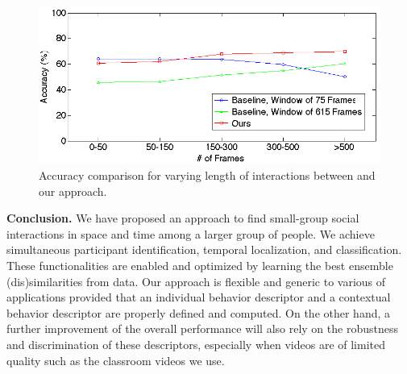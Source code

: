 \begin{figure}[t]
\begin{center}
\includegraphics[scale=0.25]{frame_no.png}
\end{center}
\caption{Accuracy comparison for varying length of interactions between \cite{CRIM13} and our approach.}
\label{frame_no}
\end{figure}

\vspace{0.05in}

\noindent\textbf{Conclusion.} We have proposed an approach to find small-group social interactions in space and time among a larger group of people. We achieve simultaneous participant identification, temporal localization, and classification. These functionalities are enabled and optimized by learning the best ensemble (dis)similarities from data. Our approach is flexible and generic to various of applications provided that an individual behavior descriptor and a contextual behavior descriptor are properly defined and computed. On the other hand, a further improvement of the overall performance will also rely on the robustness and discrimination of these descriptors, especially when videos are of limited quality such as the classroom videos we use. 
